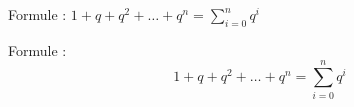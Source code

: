 Formule :
$1 + q + q^2 + \dots + q^n = \sum_{i = 0}^n q^i$

\medskip

Formule :
\[1 + q + q^2 + \dots + q^n=\sum_{i = 0}^n q^i\]
